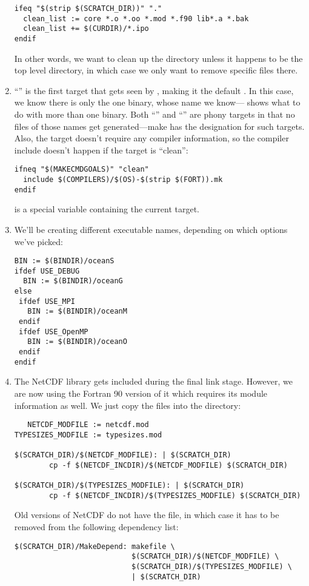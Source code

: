 \begin{enumerate}
\begin{verbatim}
ifeq "$(strip $(SCRATCH_DIR))" "."
  clean_list := core *.o *.oo *.mod *.f90 lib*.a *.bak
  clean_list += $(CURDIR)/*.ipo
endif
\end{verbatim}
In other words, we want to clean up the  directory unless
it happens to be the top level directory, in which case we only want
to remove specific files there.

\item ``'' is the first target that gets seen by ,
making it the default . In this case, we know there is only
the one binary, whose name we know---\citet{GMAKE} shows what to
do with more than one binary. Both ``'' and ``''
are phony targets in that no files of those names get generated---make
has the  designation for such targets. Also, the 
target doesn't require any compiler information, so the compiler include
doesn't happen if the target is ``clean'':

\begin{verbatim}
ifneq "$(MAKECMDGOALS)" "clean"
  include $(COMPILERS)/$(OS)-$(strip $(FORT)).mk
endif
\end{verbatim}
 is a special variable containing the current
 target.

\item We'll be creating different executable names, depending on
which options we've picked:
\begin{verbatim}
BIN := $(BINDIR)/oceanS
ifdef USE_DEBUG
  BIN := $(BINDIR)/oceanG
else
 ifdef USE_MPI
   BIN := $(BINDIR)/oceanM
 endif
 ifdef USE_OpenMP
   BIN := $(BINDIR)/oceanO
 endif
endif
\end{verbatim}

\item The NetCDF library gets included during the final link stage.
However, we are now using the Fortran 90 version of it which
requires its module information as well. We just copy the 
files into the  directory:
\begin{verbatim}
   NETCDF_MODFILE := netcdf.mod
TYPESIZES_MODFILE := typesizes.mod

$(SCRATCH_DIR)/$(NETCDF_MODFILE): | $(SCRATCH_DIR)
        cp -f $(NETCDF_INCDIR)/$(NETCDF_MODFILE) $(SCRATCH_DIR)

$(SCRATCH_DIR)/$(TYPESIZES_MODFILE): | $(SCRATCH_DIR)
        cp -f $(NETCDF_INCDIR)/$(TYPESIZES_MODFILE) $(SCRATCH_DIR)
\end{verbatim}
Old versions of NetCDF do not have the  file, in which
case it has to be removed from the following dependency list:
\begin{verbatim}
$(SCRATCH_DIR)/MakeDepend: makefile \
                           $(SCRATCH_DIR)/$(NETCDF_MODFILE) \
                           $(SCRATCH_DIR)/$(TYPESIZES_MODFILE) \
                           | $(SCRATCH_DIR)
\end{verbatim}


\end{enumerate}
